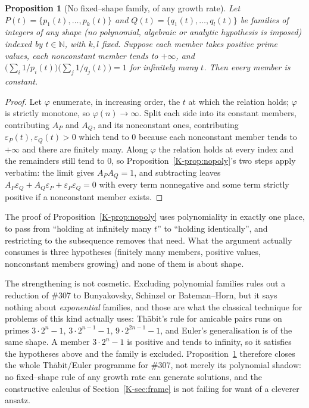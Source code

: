 \documentclass[11pt]{article}
\newtheorem{proposition}[theorem]{Proposition}
\theoremstyle{definition}
\begin{document}
\begin{proposition}[No fixed--shape family, of any growth rate]\label{prop:nofamily}
Let $P(t)=\{p_1(t),\dots,p_k(t)\}$ and $Q(t)=\{q_1(t),\dots,q_l(t)\}$ be families of integers of
\emph{any} shape (no polynomial, algebraic or analytic hypothesis is imposed) indexed by
$t\in\mathbb{N}$, with $k,l$ fixed. Suppose each member takes positive prime values, each nonconstant
member tends to $+\infty$, and
$\bigl(\sum_i1/p_i(t)\bigr)\bigl(\sum_j1/q_j(t)\bigr)=1$ for \emph{infinitely many} $t$. Then every
member is constant.
\end{proposition}
\begin{proof}
Let $\varphi$ enumerate, in increasing order, the $t$ at which the relation holds; $\varphi$ is
strictly monotone, so $\varphi(n)\to\infty$. Split each side into its constant members, contributing
$A_P$ and $A_Q$, and its nonconstant ones, contributing $\varepsilon_P(t),\varepsilon_Q(t)>0$ which
tend to $0$ because each nonconstant member tends to $+\infty$ and there are finitely many. Along
$\varphi$ the relation holds at every index and the remainders still tend to $0$, so
Proposition~\ref{K-prop:nopoly}'s two steps apply verbatim: the limit gives $A_PA_Q=1$, and subtracting
leaves $A_P\varepsilon_Q+A_Q\varepsilon_P+\varepsilon_P\varepsilon_Q=0$ with every term nonnegative
and some term strictly positive if a nonconstant member exists.
\end{proof}

The proof of Proposition~\ref{K-prop:nopoly} uses polynomiality in exactly one place, to pass from
``holding at infinitely many $t$'' to ``holding identically'', and restricting to the subsequence
removes that need. What the argument actually consumes is three hypotheses (finitely many members,
positive values, nonconstant members growing) and none of them is about shape.

The strengthening is not cosmetic. Excluding polynomial families rules out a reduction of \#307 to
Bunyakovsky, Schinzel or Bateman--Horn, but it says nothing about \emph{exponential} families, and
those are what the classical technique for problems of this kind actually uses: Th\=abit's rule for
amicable pairs runs on primes $3\cdot2^{n}-1$, $3\cdot2^{n-1}-1$, $9\cdot2^{2n-1}-1$, and Euler's
generalisation is of the same shape. A member $3\cdot2^{n}-1$ is positive and tends to infinity, so
it satisfies the hypotheses above and the family is excluded. Proposition~\ref{prop:nofamily}
therefore closes the whole Th\=abit/Euler programme for \#307, not merely its polynomial shadow: no
fixed--shape rule of any growth rate can generate solutions, and the constructive calculus of
Section~\ref{K-sec:frame} is not failing for want of a cleverer ansatz.
\end{document}
